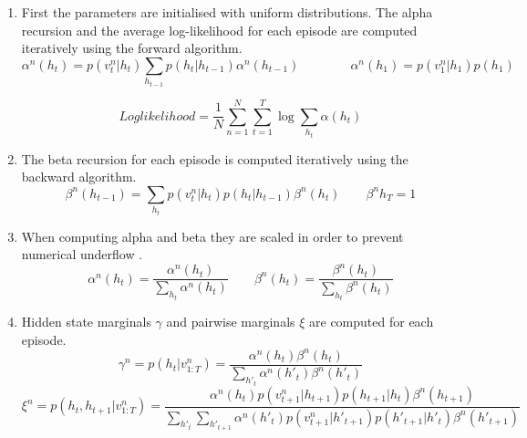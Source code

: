 \documentclass[a4paper, 11pt]{article}
\begin{document}
\begin{enumerate}


\item First the parameters are initialised with uniform distributions. The alpha recursion and the average log-likelihood for each episode are computed iteratively using the forward algorithm.
\begin{equation}
\alpha^n(h_t) = p(v_t^n|h_t)\sum\limits_{h_{t-1}}p(h_t|h_{t-1})\alpha^n(h_{t-1}) \qquad \qquad \alpha^n(h_1)=p(v_1^n|h_1)p(h_1)
\end{equation}

\begin{equation}
Log likelihood=\frac{1}{N} \sum\limits_{n=1}^N \sum\limits_{t=1}^T \log\sum\limits_{h_t} \alpha(h_t) 
\end{equation}

\item The beta recursion for each episode is computed iteratively using the backward algorithm.
\begin{equation}
\beta^n(h_{t-1})=\sum\limits_{h_t} p(v_t^n|h_t)p(h_t|h_{t-1}) \beta^n(h_t) \qquad \beta^n{h_T}=1
\end{equation}

\item When computing alpha and beta they are scaled in order to prevent numerical underflow \cite{Rabiner1989}.
\begin{equation}
\alpha^n(h_t)= \frac{\alpha^n(h_t)}{\sum\limits_{h_t}\alpha^n(h_t)} \qquad \beta^n(h_t) = \frac{\beta^n(h_t)}{\sum\limits_{h_t}\beta^n(h_t)}
\end{equation}

\item Hidden state marginals $\gamma$ and pairwise marginals $\xi$ are computed for each episode.
\begin{equation}
\gamma^n = p(h_t|v_{1:T}^n) = \frac{\alpha^n(h_t)\beta^n(h_t)}{\sum\limits_{h'_t} \alpha^n(h'_t)\beta^n(h'_t)}
\end{equation}
\begin{equation}
\xi^n = p(h_t,h_{t+1}|v^n_{1:T}) = \frac{
\alpha^n(h_t) p(v_{t+1}^n|h_{t+1}) p(h_{t+1}|h_t) \beta^n(h_{t+1})} 
{\sum\limits_{h'_t}\sum\limits_{h'_{t+1}}\alpha^n(h'_t) p(v_{t+1}^n|h'_{t+1}) p(h'_{t+1}|h'_t) \beta^n(h'_{t+1})}
\end{equation}


\end{enumerate}
\end{document}
